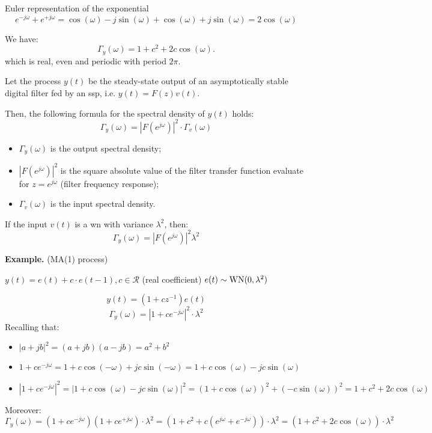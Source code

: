 Euler representation of the exponential
$$
e^{-j \omega}+e^{+j \omega}=\cos (\omega)-j \sin (\omega)+\cos (\omega)+j \sin (\omega)=2 \cos (\omega)
$$

We have:
$$\Gamma_y(\omega)=1+c^{2}+2 c \cos (\omega).$$
which is real, even and periodic with period $2 \pi$.

Let the process $y(t)$ be the steady-state output of an asymptotically stable digital filter fed by an \gls{ssp}, i.e. $y(t)=F(z) v(t)$.

Then, the following formula for the spectral density of $y(t)$ holds:
$$\Gamma_{y}(\omega)=|F\left(e^{j \omega}\right)|^{2} \cdot \Gamma_{v}(\omega)$$

\begin{itemize}
	\item $\Gamma_{y}(\omega)$ is the output spectral density;
	\item $\left|F\left(e^{j \omega}\right)\right|^{2}$ is the square absolute value of the filter transfer function evaluate for $z=e^{j \omega}$ (filter frequency response);
	\item $\Gamma_{v}(\omega)$ is the input spectral density.
\end{itemize}

If the input $v(t)$ is a \gls{wn} with variance $\lambda^{2}$, then:
$$
\Gamma_{y}(\omega)=\left|F\left(e^{j \omega}\right)\right|^{2} \lambda^{2}
$$

\textbf{Example.} (MA(1) process)

$y(t)=e(t)+c \cdot e(t-1), c \in \mathcal{R}$ (real coefficient)
$e(t)\sim \operatorname{WN}(0,\lambda^{2} )$

$$
y(t)=\left(1+c z^{-1}\right) e(t)
$$
$$
\Gamma_{y}(\omega)=\left|1+c e^{-j \omega}\right|^{2} \cdot \lambda^{2}
$$
Recalling that:
\begin{itemize}
	\item $|a+j b|^{2}=(a+j b)(a-j b)=a^{2}+b^{2}$
	\item $1+c e^{-j \omega}=1+c \cos (-\omega)+jc \sin (-\omega)=1+c \cos (\omega)-j c\sin (\omega)$ 
	\item$\left|1+c e^{-j \omega}\right|^{2}=\left|1+c \cos (\omega)-j c\sin (\omega)\right|^{2}=\left(1+c \cos (\omega)\right)^2+\left(-c\sin (\omega)\right)^2=1+c^{2}+2 c \cos (\omega)$
\end{itemize}
Moreover:
$$
\Gamma_{y}(\omega)=\left(1+c e^{-j \omega}\right)\left(1+c e^{+j \omega}\right)\cdot \lambda^{2}=(1+c^{2}+c\left(e^{j \omega}+e^{-j \omega}\right))\cdot \lambda^{2}=(1+c^{2}+2 c \cos (\omega))\cdot \lambda^{2}
$$

